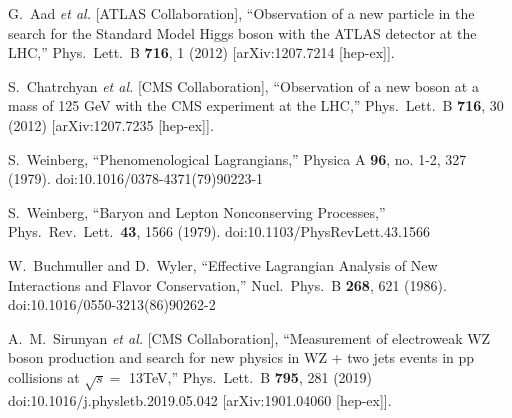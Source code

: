 \begin{thebibliography}{99}
\raggedright


  G.~Aad {\it et al.}  [ATLAS Collaboration],
  ``Observation of a new particle in the search for the Standard Model Higgs boson with the ATLAS detector at the LHC,''
  Phys.\ Lett.\ B {\bf 716}, 1 (2012)
  [arXiv:1207.7214 [hep-ex]].


  S.~Chatrchyan {\it et al.}  [CMS Collaboration],
  ``Observation of a new boson at a mass of 125 GeV with the CMS experiment at the LHC,''
  Phys.\ Lett.\ B {\bf 716}, 30 (2012)
  [arXiv:1207.7235 [hep-ex]].

  S.~Weinberg,
  ``Phenomenological Lagrangians,''
  Physica A {\bf 96}, no. 1-2, 327 (1979).
  doi:10.1016/0378-4371(79)90223-1

  S.~Weinberg,
  ``Baryon and Lepton Nonconserving Processes,''
  Phys.\ Rev.\ Lett.\  {\bf 43}, 1566 (1979).
  doi:10.1103/PhysRevLett.43.1566

  W.~Buchmuller and D.~Wyler,
  ``Effective Lagrangian Analysis of New Interactions and Flavor Conservation,''
  Nucl.\ Phys.\ B {\bf 268}, 621 (1986).
  doi:10.1016/0550-3213(86)90262-2

  A.~M.~Sirunyan {\it et al.} [CMS Collaboration],
  ``Measurement of electroweak WZ boson production and search for new physics in WZ + two jets events in pp collisions at $\sqrt{s} =$ 13TeV,''
  Phys.\ Lett.\ B {\bf 795}, 281 (2019)
  doi:10.1016/j.physletb.2019.05.042
  [arXiv:1901.04060 [hep-ex]].


\end{thebibliography}
